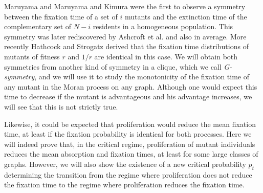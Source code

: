 \documentclass[a4paper,english,10pt]{amsart}
\theoremstyle{definition}
\numberwithin{equation}{section}
\begin{document}
Maruyama \cite{MaruyamaTimes1974} and Maruyama and Kimura \cite{MaruyamaKimura} were the first to observe a symmetry between the fixation time of a set of $i$ mutants and the extinction time of the complementary set of $N-i$ residents in a homogeneous population. This symmetry was later rediscovered by Ashcroft et al. \cite{Traulsen2015} and also \cite{Taylor2006} in average. More recently Hathcock and Strogatz \cite{HathcockStrogatz} derived that the fixation time distributions of mutants of fitness $r$ and $1/r$ are identical in this case. 
We will obtain both symmetries from another kind of symmetry in a clique, which we call \emph{G-symmetry}, and we will use it to study the monotonicity of the fixation time of any mutant in the Moran process on any graph.
Although one would expect this time to decrease if the mutant is advantageous and his advantage increases, we will see that this is not strictly true.

Likewise, it could be expected that proliferation would reduce the mean fixation time, at least if the fixation probability is identical for both processes.
Here we will indeed prove that, in the critical regime, proliferation of mutant individuals reduces the mean absorption and fixation times, at least for some large classes of graphs. 
However, we will also show the existence of a new critical probability $p_t$ determining the transition from the regime where proliferation does not reduce the fixation time to the regime where proliferation reduces the fixation time.
 
\end{document}
